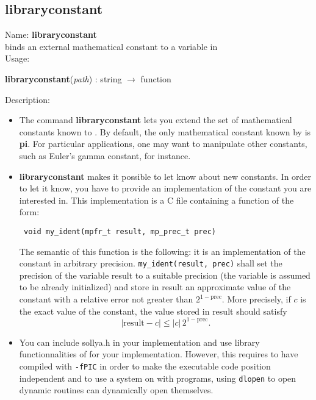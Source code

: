\subsection{libraryconstant}
\label{lablibraryconstant}
\noindent Name: \textbf{libraryconstant}\\
binds an external mathematical constant to a variable in \sollya\\
\noindent Usage: 
\begin{center}
\textbf{libraryconstant}(\emph{path}) : \textsf{string} $\rightarrow$ \textsf{function}\\
\end{center}
\noindent Description: \begin{itemize}

\item The command \textbf{libraryconstant} lets you extend the set of mathematical
   constants known to \sollya.
   By default, the only mathematical constant known by \sollya is \textbf{pi}.
   For particular applications, one may want to
   manipulate other constants, such as Euler's gamma constant, for instance.

\item \textbf{libraryconstant} makes it possible to let \sollya know about new constants.
   In order to let it know, you have to provide an implementation of the
   constant you are interested in. This implementation is a C file containing
   a function of the form:
   \begin{verbatim} void my_ident(mpfr_t result, mp_prec_t prec)\end{verbatim}
   The semantic of this function is the following: it is an implementation of
   the constant in arbitrary precision.
   \verb|my_ident(result, prec)| shall set the
   precision of the variable result to a suitable precision (the variable is
   assumed to be already initialized) and store in result an approximate value
   of the constant with a relative error not greater than $2^{1-\mathrm{prec}}$.
   More precisely, if $c$ is the exact value of the constant, the value stored
   in result should satisfy $$|\mathrm{result}-c| \le |c|\,2^{1-\mathrm{prec}}.$$

\item You can include sollya.h in your implementation and use library 
   functionnalities of \sollya for your implementation. However, this requires to
   have compiled \sollya with \texttt{-fPIC} in order to make the \sollya executable
   code position independent and to use a system on with programs, using \texttt{dlopen}
   to open dynamic routines can dynamically open themselves.


\end{itemize}
